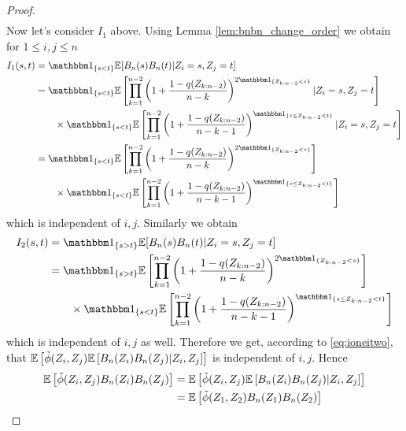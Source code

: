 \begin{lemma}
\begin{proof}
\begin{align*}
		\end{align*}
		Now let's consider $I_1$ above. Using Lemma \ref{lem:bnbn_change_order} we obtain for $1\leq i,j\leq n$
		\begin{align*}
		I_1(s,t) &= \I{s<t} \E[B_n(s)B_n(t)|Z_i=s, Z_j=t]\\
		&=\I{s<t} \E\left[\prod_{k=1}^{n-2}\left(1+\frac{1-q(Z_{k:n-2})}{n-k}\right)^{2\I{Z_{k:n-2}<s}}|Z_i=s, Z_j=t\right]\\
		&\qquad \times \I{s<t} \E\left[\prod_{k=1}^{n-2}\left(1+\frac{1-q(Z_{k:n-2})}{n-k-1}\right)^{\I{s\leq Z_{k:n-2}<t}}|Z_i=s, Z_j=t\right]\\
		&= \I{s<t} \E\left[\prod_{k=1}^{n-2}\left(1+\frac{1-q(Z_{k:n-2})}{n-k}\right)^{2\I{Z_{k:n-2}<s}}\right]\\
		&\qquad \times \I{s<t} \E\left[\prod_{k=1}^{n-2}\left(1+\frac{1-q(Z_{k:n-2})}{n-k-1}\right)^{\I{s\leq Z_{k:n-2}<t}}\right]
		\end{align*}
		which is independent of $i,j$. Similarly we obtain
		\begin{align*}
		I_2(s,t) &= \I{s>t} \E[B_n(s)B_n(t)|Z_i=s, Z_j=t]\\
		&= \I{s>t} \E\left[\prod_{k=1}^{n-2}\left(1+\frac{1-q(Z_{k:n-2})}{n-k}\right)^{2\I{Z_{k:n-2}<s}}\right]\\
		&\qquad \times \I{s<t} \E\left[\prod_{k=1}^{n-2}\left(1+\frac{1-q(Z_{k:n-2})}{n-k-1}\right)^{\I{s\leq Z_{k:n-2}<t}}\right]
		\end{align*}
		which is independent of $i,j$ as well. Therefore we get, according to \eqref{eq:ioneitwo}, that $\mathbb{E}\left[\tilde{\phi}(Z_{i},Z_{j}) \mathbb{E}\left[B_n(Z_{i}) B_n(Z_{j})| Z_i,Z_j\right]\right]$ is independent of $i,j$. Hence
		\begin{align*}
		\mathbb{E}\left[\tilde{\phi}(Z_{i},Z_{j}) B_n(Z_{i}) B_n(Z_{j})\right] &= \mathbb{E}\left[\tilde{\phi}(Z_{i},Z_{j}) \mathbb{E}\left[B_n(Z_{i}) B_n(Z_{j})| Z_i,Z_j\right]\right]\\
		&= \mathbb{E}\left[\tilde{\phi}(Z_{1},Z_{2}) B_n(Z_{1}) B_n(Z_{2})\right]
		\end{align*}
	\end{proof}
\end{lemma}
